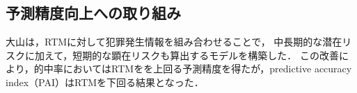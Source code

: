 
\subsection{予測精度向上への取り組み}
大山\cite{大山智也2020日本}は，RTMに対して犯罪発生情報を組み合わせることで，
中長期的な潜在リスクに加えて，短期的な顕在リスクも算出するモデルを構築した．
この改善により，的中率においてはRTMをを上回る予測精度を得たが，predictive accuracy index（PAI）はRTMを下回る結果となった．

